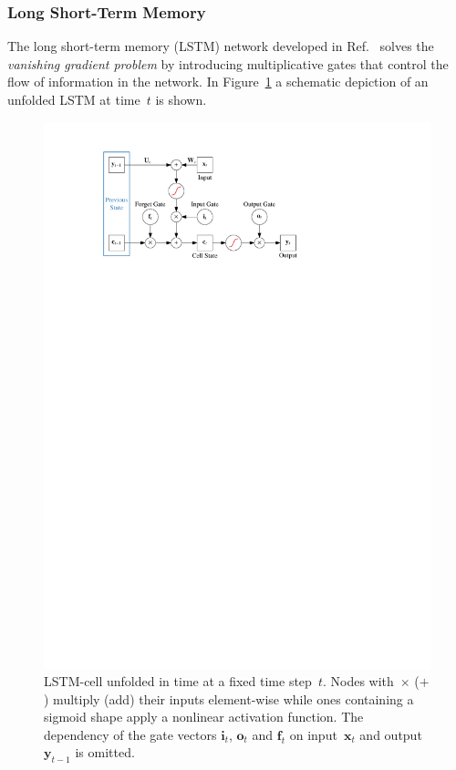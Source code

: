 \subsubsection{Long Short-Term Memory}
\label{sec:lstm}
The long short-term memory (LSTM) network developed in Ref.~\cite{lstm} solves
the \emph{vanishing gradient problem} by introducing multiplicative gates
 that control the flow of information in the network. In
Figure~\ref{fig:schematic_lstm} a schematic depiction of an unfolded LSTM at
time~$t$ is shown.
\begin{figure}[htb]
  \centering
  \includegraphics{./figures/theory/LSTM.pdf}
  \caption{LSTM-cell unfolded in time at a fixed time step~$t$. Nodes
    with~$\times$ ($+$) multiply (add) their inputs element-wise while ones
    containing a sigmoid shape apply a nonlinear activation function. The
    dependency of the gate vectors $\mathbf{i}_t$, $\mathbf{o}_t$ and
    $\mathbf{f}_t$ on input~$\mathbf{x}_t$ and output~$\mathbf{y}_{t-1}$ is
    omitted.}
  \label{fig:schematic_lstm}
\end{figure}
